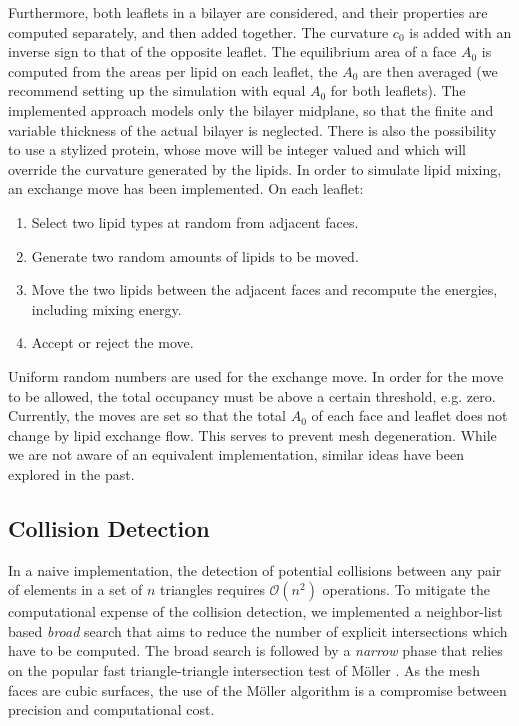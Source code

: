\documentclass[twocolumn]{biophys-new}
\begin{document}
Furthermore, both leaflets in a bilayer are considered, and their properties are computed separately, and then added together. The curvature $c_0$ is added with an inverse sign to that of the opposite leaflet.
The equilibrium area of a face $A_0$ is computed from the areas per lipid on each leaflet, the $A_0$ are then averaged (we recommend setting up the simulation with equal $A_0$ for both leaflets).
The implemented approach models only the bilayer midplane, so that the finite and variable thickness of the actual bilayer is neglected. 
There is also the possibility to use a stylized protein, whose move will be integer valued and which will override the curvature generated by the lipids.
In order to simulate lipid mixing, an exchange move has been implemented. On each leaflet:
\begin{enumerate}
 \item Select two lipid types at random from adjacent faces.
 \item Generate two random amounts of lipids to be moved.
 \item Move the two lipids between the adjacent faces and recompute the energies, including mixing energy.
 \item Accept or reject the move.
\end{enumerate}
 Uniform random numbers are used for the exchange move. In order for the move to be allowed, the total occupancy must be above a certain threshold, e.g. zero. Currently, the moves are set so that the total $A_0$ of each face and leaflet does not change by lipid exchange flow. This serves to prevent mesh degeneration. While we are not aware of an equivalent implementation, similar ideas have been explored in the past.\cite{Kumar2001}

\subsection*{Collision Detection}

In a naive implementation, the detection of potential collisions between any pair of elements in a set of $n$ triangles requires $\mathcal{O}(n^2)$ operations. To mitigate the computational expense of the collision detection, we implemented a neighbor-list based \textit{broad} \cite{ericson2004real} search that aims to reduce the number of explicit intersections which have to be computed. The broad search is followed by a \textit{narrow} phase that relies on the popular \cite{kurniawan2019surface, landstorfer2021mesh, mandal2022interactive} fast triangle-triangle intersection test of Möller \cite{moller1997fast}. As the mesh faces are cubic surfaces, the use of the Möller algorithm is a compromise between precision and computational cost.
\end{document}

